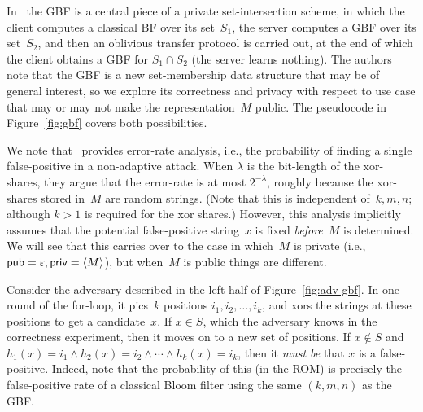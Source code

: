 In~\cite{dong2013private} the GBF is a central piece of a private set-intersection
scheme, in which the client computes a classical BF over its
set~$S_1$, the server computes a GBF over its set~$S_2$, and then an
oblivious transfer protocol is carried out, at the end of which the
client obtains a GBF for $S_1 \cap S_2$ (the server learns nothing).
The authors note that the GBF is a new set-membership data structure
that may be of general interest, so we explore its correctness and
privacy with respect to use case that may or may not make the
representation~$M$ public. The pseudocode in Figure~\ref{fig:gbf}
covers both possibilities.

We note that~\cite{dong2013private} provides error-rate analysis, i.e., the
probability of finding a single false-positive in a non-adaptive
attack.  When $\lambda$ is the bit-length of the xor-shares, they
argue that the error-rate is at most $2^{-\lambda}$, roughly because
the xor-shares stored in~$M$ are random strings.  (Note that
  this is independent of~$k,m,n$; although $k>1$ is required for the
  xor shares.)  However, this analysis implicitly assumes that the potential false-positive string~$x$ is fixed
\emph{before}~$M$ is determined.  We will see that this carries over
 to the case in which~$M$ is private (i.e.,
${\sf pub}=\varepsilon,{\sf priv}=\langle M \rangle$), but when~$M$ is
public things are different.

Consider the adversary described in the left half of
Figure~\ref{fig:adv-gbf}.  In one round of the for-loop, it pics~$k$
positions $i_1,i_2,\ldots,i_k$, and xors the strings at these
positions to get a candidate~$x$.   If $x \in S$, which the
adversary knows in the correctness experiment, then it moves on to a
new set of positions.  If $x \not\in S$ and $h_{1}(x)=i_1 \wedge
h_2(x)=i_2 \wedge \cdots \wedge h_k(x) = i_k$, then it \emph{must
be} that $x$ is a false-positive.   Indeed, note that the
probability of this (in the ROM) is precisely the false-positive
rate of a classical Bloom filter using the same $(k,m,n)$ as the
GBF.

